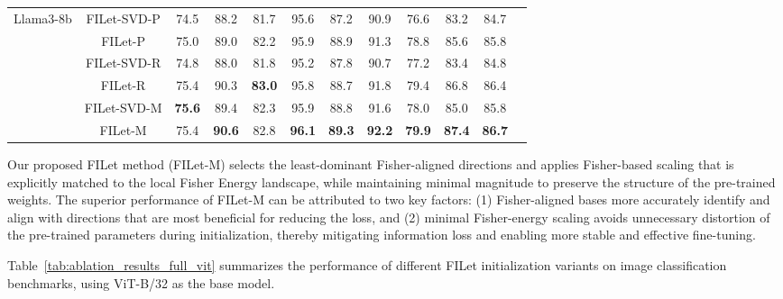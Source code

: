 \documentclass{article}
\theoremstyle{plain}
\theoremstyle{definition}
\theoremstyle{remark}
\begin{document}
\begin{table}[ht]
{\begin{tabular}{cccccccccccc}
      \hline
    \multirow{6}{*}{Llama3-8b} %
      & FILet-SVD-P & 74.5 & 88.2 & 81.7 & 95.6 & 87.2 & 90.9 & 76.6 & 83.2 & 84.7 \\
      & FILet-P & 75.0 & 89.0 & 82.2 & 95.9 & 88.9 & 91.3 & 78.8 & 85.6 & 85.8 \\
      & FILet-SVD-R & 74.8 & 88.0 & 81.8 & 95.2 & 87.8 & 90.7 & 77.2 & 83.4 & 84.8 \\
      & FILet-R & 75.4 & 90.3 & \textbf{83.0} & 95.8 & 88.7 & 91.8 & 79.4 & 86.8 & 86.4\\
      & FILet-SVD-M & \textbf{75.6} & 89.4 & 82.3 & 95.9 & 88.8 & 91.6 & 78.0 & 85.0 & 85.8\\
      & FILet-M & 75.4 & \textbf{90.6} & 82.8 & \textbf{96.1} & \textbf{89.3} & \textbf{92.2} & \textbf{79.9} & \textbf{87.4} & \textbf{86.7}\\

      \hline
    \end{tabular}
  }
  
\end{table}

Our proposed FILet method (FILet-M) selects the least-dominant Fisher-aligned directions and applies Fisher-based scaling that is explicitly matched to the local Fisher Energy landscape, while maintaining minimal magnitude to preserve the structure of the pre-trained weights. The superior performance of FILet-M can be attributed to two key factors: (1) Fisher-aligned bases more accurately identify and align with directions that are most beneficial for reducing the loss, and (2) minimal Fisher-energy scaling avoids unnecessary distortion of the pre-trained parameters during initialization, thereby mitigating information loss and enabling more stable and effective fine-tuning.

Table~\ref{tab:ablation_results_full_vit} summarizes the performance of different FILet initialization variants on image classification benchmarks, using ViT-B/32 as the base model.
\end{document}
